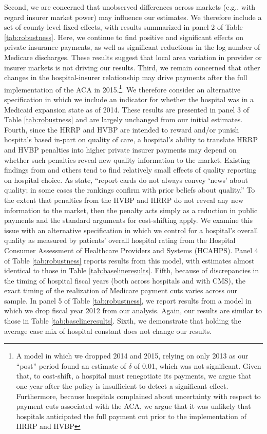 \documentclass[12pt]{article}
\begin{document}
Second, we are concerned that unobserved differences across markets (e.g., with regard insurer market power) may influence our estimates. We therefore include a set of county-level fixed effects, with results summarized in panel 2 of Table \ref{tab:robustness}. Here, we continue to find positive and significant effects on private insurance payments, as well as significant reductions in the log number of Medicare discharges. These results suggest that local area variation in provider or insurer markets is not driving our results.  Third, we remain concerned that other changes in the hospital-insurer relationship may drive payments after the full implementation of the ACA in 2015.\footnote{A model in which we dropped 2014 and 2015, relying on only 2013 as our ``post'' period found an estimate of $\delta$ of 0.01, which was not significant.  Given that, to cost-shift, a hospital must renegotiate its payments, we argue that one year after the policy is insufficient to detect a significant effect.  Furthermore, because hospitals complained about uncertainty with respect to payment cuts associated with the ACA, we argue that it was unlikely that hospitals anticipated the full payment cut prior to the implementation of HRRP and HVBP}. We therefore consider an alternative specification in which we include an indicator for whether the hospital was in a Medicaid expansion state as of 2014. These results are presented in panel 3 of Table \ref{tab:robustness} and are largely unchanged from our initial estimates.  Fourth, since the HRRP and HVBP are intended to reward and/or punish hospitals based in-part on quality of care, a hospital's ability to translate HRRP and HVBP penalties into higher private insurer payments may depend on whether such penalties reveal new quality information to the market. Existing findings from \cite{dranove2008} and others tend to find relatively small effects of quality reporting on hospital choice. As \cite{dranove2008} state, ``report cards do not always convey `news' about quality; in some cases the rankings confirm with prior beliefs about quality.'' To the extent that penalties from the HVBP and HRRP do not reveal any new information to the market, then the penalty acts simply as a reduction in public payments and the standard arguments for cost-shifting apply. We examine this issue with an alternative specification in which we control for a hospital's overall quality as measured by patients' overall hospital rating from the Hospital Consumer Assessment of Healthcare Providers and Systems (HCAHPS).  Panel 4 of Table \ref{tab:robustness} reports results from this model, with estimates almost identical to those in Table \ref{tab:baselineresults}.  Fifth, because of discrepancies in the timing of hospital fiscal years (both across hospitals and with CMS), the exact timing of the realization of Medicare payment cuts varies across our sample. In panel 5 of Table \ref{tab:robustness}, we report results from a model in which we drop fiscal year 2012 from our analysis. Again, our results are similar to those in Table \ref{tab:baselineresults}.  Sixth, we demonstrate that holding the average case mix of hospital constant does not change our results.  
\end{document}
